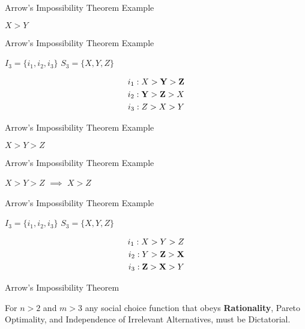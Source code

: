 \documentclass{beamer}
\begin{document}
\begin{frame}{Arrow's Impossibility Theorem Example}

\huge 

\center $X > Y$
\end{frame}

\begin{frame}{Arrow's Impossibility Theorem Example}

\huge 

$I_3 = \{i_1, i_2, i_3\}$ \hfill $S_3 = \{X, Y, Z\}$

\begin{align*}
    \huge i_1: X > \mathbf{Y > Z} \\
    \huge i_2: \mathbf{Y > Z} > X \\
    \huge i_3: Z > X > Y
\end{align*}
\end{frame}

\begin{frame}{Arrow's Impossibility Theorem Example}

\huge 

\center $X > Y > Z$
\end{frame}

\begin{frame}{Arrow's Impossibility Theorem Example}

\huge 

\center $X > Y > Z$ $\implies$ $X > Z$
\end{frame}

\begin{frame}{Arrow's Impossibility Theorem Example}

\huge 

$I_3 = \{i_1, i_2, i_3\}$ \hfill $S_3 = \{X, Y, Z\}$

\begin{align*}
    \huge i_1: X > Y > Z \\
    \huge i_2: Y > \mathbf{Z > X} \\
    \huge i_3: \mathbf{Z > X} > Y
\end{align*}
\end{frame}

\begin{frame}{Arrow's Impossibility Theorem}
    \begin{theorem}
    For $n > 2$ and $m > 3$ any social choice function that obeys \textbf{Rationality}, Pareto Optimality, and Independence of Irrelevant Alternatives, must be Dictatorial.
    \end{theorem}
\end{frame}
\end{document}
